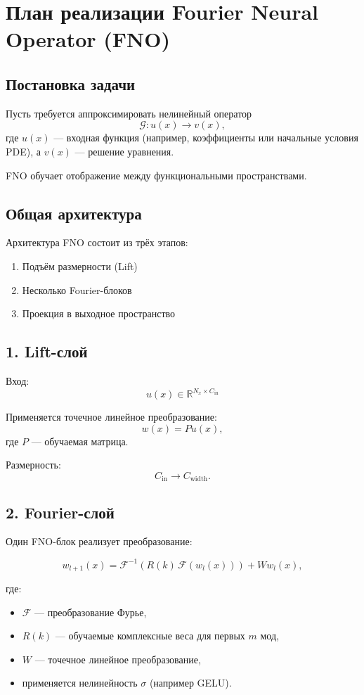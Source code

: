 \section{План реализации Fourier Neural Operator (FNO)}

\subsection{Постановка задачи}

Пусть требуется аппроксимировать нелинейный оператор
\[
\mathcal{G} : u(x) \rightarrow v(x),
\]
где $u(x)$ — входная функция (например, коэффициенты или начальные условия PDE),
а $v(x)$ — решение уравнения.

FNO обучает отображение между функциональными пространствами.

\subsection{Общая архитектура}

Архитектура FNO состоит из трёх этапов:

\begin{enumerate}
    \item Подъём размерности (Lift)
    \item Несколько Fourier-блоков
    \item Проекция в выходное пространство
\end{enumerate}

\subsection{1. Lift-слой}

Вход:
\[
u(x) \in \mathbb{R}^{N_x \times C_{\text{in}}}
\]

Применяется точечное линейное преобразование:
\[
w(x) = P u(x),
\]
где $P$ — обучаемая матрица.

Размерность:
\[
C_{\text{in}} \rightarrow C_{\text{width}}.
\]

\subsection{2. Fourier-слой}

Один FNO-блок реализует преобразование:

\[
w_{l+1}(x) =
\mathcal{F}^{-1} \left(
R(k)\,\mathcal{F}(w_l(x))
\right)
+
W w_l(x),
\]

где:

\begin{itemize}
    \item $\mathcal{F}$ — преобразование Фурье,
    \item $R(k)$ — обучаемые комплексные веса для первых $m$ мод,
    \item $W$ — точечное линейное преобразование,
    \item применяется нелинейность $\sigma$ (например GELU).
\end{itemize}

